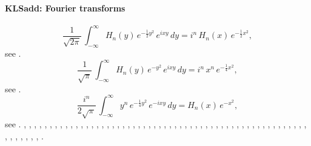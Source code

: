 \documentclass[envcountchap,graybox]{svmono}
\newcommand\half{\frac12}
\newcommand\iy\infty
\begin{document}
\paragraph{\large\bf KLSadd: Fourier transforms}\begin{equation}
\frac1{\sqrt{2\pi}}\,\int_{-\iy}^\iy H_n(y)\,e^{-\half y^2}\,e^{ixy}\,dy=
i^n\,H_n(x)\,e^{-\half x^2},
\label{15}
\end{equation}
see .
\begin{equation}
\frac1{\sqrt\pi}\,\int_{-\iy}^\iy H_n(y)\,e^{-y^2}\,e^{ixy}\,dy=
i^n\,x^n\,e^{-\frac14 x^2},
\label{16}
\end{equation}
see .
\begin{equation}
\frac{i^n}{2\sqrt\pi}\,\int_{-\iy}^\iy y^n\,e^{-\frac14 y^2}\,e^{-ixy}\,dy=
H_n(x)\,e^{-x^2},
\label{17}
\end{equation}
see .
%
\cite{Abram}, \cite{NAlSalam66}, \cite{AlSalam90}, \cite{AlSalamChihara72},
\cite{AlSalamChihara76}, \cite{AndrewsAskey85}, \cite{AndrewsAskeyRoy}, \cite{Area+I}, 
\cite{Askey68}, \cite{Askey75}, \cite{Askey89I}, \cite{AskeyGasper76}, \cite{AskeyWilson85}, 
\cite{Azor}, \cite{Berg}, \cite{BilodeauII}, \cite{Brafman51}, \cite{Brafman57II}, 
\cite{Brenke}, \cite{CarlitzSrivastava}, \cite{ChenSrivastava}, \cite{Chihara78}, 
\cite{Cohen}, \cite{Danese}, \cite{DetteStudden92}, \cite{DetteStudden95}, \cite{Doha2004I},
\cite{Erdelyi+}, \cite{Faldey}, \cite{Gawronski87}, \cite{Gawronski93}, \cite{Gillis+},
\cite{Godoy+}, \cite{Grad}, \cite{Ismail74}, \cite{Ismail2005II}, \cite{IsmailStanton97},
\cite{Koekoek2000}, \cite{Koorn88}, \cite{Krasikov2004}, \cite{Kwon+}, \cite{LabelleYehIII},
\cite{Lesky95II}, \cite{Lesky96}, \cite{LewanowiczI}, \cite{LopezTemme99}, \cite{Mathai},
\cite{Meixner}, \cite{Nikiforov+}, \cite{NikiforovUvarov}, \cite{Olver}, \cite{Pittaluga},
\cite{Rainville}, \cite{SainteViennot}, \cite{Srivastava71}, \cite{SrivastavaMathur},
\cite{Szego75}, \cite{Temme}, \cite{TemmeLopez2000}, \cite{Trickovic}, \cite{Viennot},
\cite{Weisner59}, \cite{Wyman}.
\end{document}
